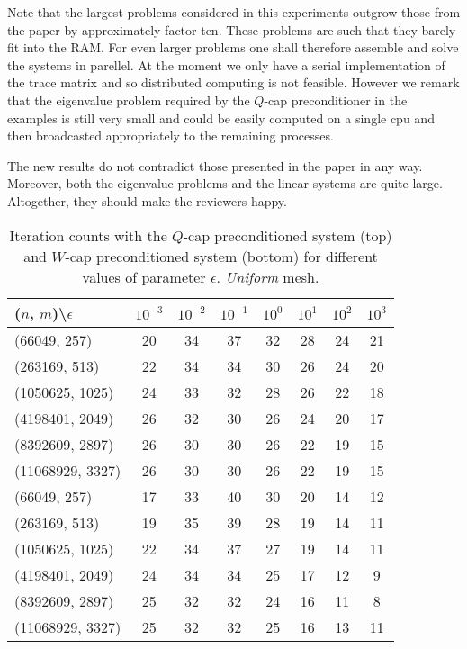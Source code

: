 \documentclass[10pt, a4paper]{article}
\begin{document}
Note that the largest problems considered in this experiments outgrow those from 
the paper by approximately factor ten. These problems are such that they barely 
fit into the RAM. For even larger problems one shall therefore assemble and solve 
the systems in parellel. At the moment we only have a serial implementation of the 
trace matrix and so distributed computing is not feasible. However we remark that 
the eigenvalue problem required by the $Q$-cap preconditioner in the examples is 
still very small and could be easily computed on a single cpu and then broadcasted 
appropriately to the remaining processes.

The new results do not contradict those presented in the paper in any way. Moreover, 
both the eigenvalue problems and the linear systems are quite large. Altogether, 
they should make the reviewers happy.
\begin{table}[ht]
  \caption{Iteration counts with the $Q$-cap preconditioned system (top) and $W$-cap 
  preconditioned system (bottom) for different values of parameter $\epsilon$. 
  \textit{Uniform} mesh.
}
\label{tab:iter}
\footnotesize{
\begin{tabular}{l|ccccccc}
\hline
($n$, $m$)\textbackslash $\epsilon$ & $10^{-3}$ & $10^{-2}$ & $10^{-1}$ & $10^{0}$ & $10^{1}$ & $10^{2}$ & $10^{3}$\\
\hline
(66049, 257) & 20 & 34 & 37 & 32 & 28 & 24 & 21\\
(263169, 513) & 22 & 34 & 34 & 30 & 26 & 24 & 20\\
(1050625, 1025) & 24 & 33 & 32 & 28 & 26 & 22 & 18\\
(4198401, 2049) & 26 & 32 & 30 & 26 & 24 & 20 & 17\\
(8392609, 2897) & 26 & 30 & 30 & 26 & 22 & 19 & 15\\
(11068929, 3327) & 26 & 30 & 30 & 26 & 22 & 19 & 15\\
\hline
\hline
(66049, 257) & 17 & 33 & 40 & 30 & 20 & 14 & 12\\
(263169, 513) & 19 & 35 & 39 & 28 & 19 & 14 & 11\\
(1050625, 1025) & 22 & 34 & 37 & 27 & 19 & 14 & 11\\
(4198401, 2049) & 24 & 34 & 34 & 25 & 17 & 12 & 9\\
(8392609, 2897) & 25 & 32 & 32 & 24 & 16 & 11 & 8\\
(11068929, 3327) & 25 & 32 & 32 & 25 & 16 & 13 & 11\\
\hline
\end{tabular}
}
\end{table}
\end{document}
